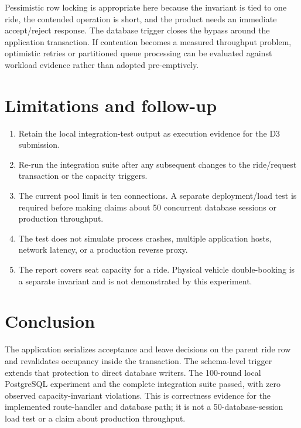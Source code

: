 \documentclass[11pt,a4paper]{article}
\begin{document}
Pessimistic row locking is appropriate here because the invariant is tied to one ride, the
contended operation is short, and the product needs an immediate accept/reject response. The
database trigger closes the bypass around the application transaction. If contention becomes a
measured throughput problem, optimistic retries or partitioned queue processing can be evaluated
against workload evidence rather than adopted pre-emptively.

\section{Limitations and follow-up}

\begin{enumerate}
  \item Retain the local integration-test output as execution evidence for the D3 submission.
  \item Re-run the integration suite after any subsequent changes to the ride/request transaction
        or the capacity triggers.
  \item The current pool limit is ten connections. A separate deployment/load test is required
        before making claims about 50 concurrent database sessions or production throughput.
  \item The test does not simulate process crashes, multiple application hosts, network latency,
        or a production reverse proxy.
  \item The report covers seat capacity for a ride. Physical vehicle double-booking is a separate
        invariant and is not demonstrated by this experiment.
\end{enumerate}

\section{Conclusion}

The application serializes acceptance and leave decisions on the parent ride row and revalidates
occupancy inside the transaction. The schema-level trigger extends that protection to direct
database writers. The 100-round local PostgreSQL experiment and the complete integration suite
passed, with zero observed capacity-invariant violations. This is correctness evidence for the
implemented route-handler and database path; it is not a 50-database-session load test or a claim
about production throughput.
\end{document}
